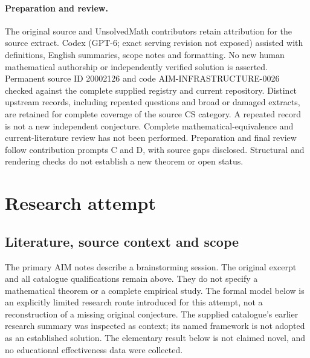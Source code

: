 \documentclass[11pt]{article}
\begin{document}
\paragraph{Preparation and review.}
The original source and UnsolvedMath contributors retain attribution for the source extract. Codex (GPT-6; exact serving revision not exposed) assisted with definitions, English summaries, scope notes and formatting. No new human mathematical authorship or independently verified solution is asserted. Permanent source ID 20002126 and code AIM-INFRASTRUCTURE-0026 checked against the complete supplied registry and current repository. Distinct upstream records, including repeated questions and broad or damaged extracts, are retained for complete coverage of the source CS category. A repeated record is not a new independent conjecture. Complete mathematical-equivalence and current-literature review has not been performed. Preparation and final review follow contribution prompts C and D, with source gaps disclosed. Structural and rendering checks do not establish a new theorem or open status.
\label{end:20002126}

\section{Research attempt}
\subsection{Literature, source context and scope}
The primary AIM notes describe a brainstorming session. The original excerpt and all catalogue qualifications remain above. They do not specify a mathematical theorem or a complete empirical study. The formal model below is an explicitly limited research route introduced for this attempt, not a reconstruction of a missing original conjecture. The supplied catalogue's earlier research summary was inspected as context; its named framework is not adopted as an established solution. The elementary result below is not claimed novel, and no educational effectiveness data were collected.
\end{document}
